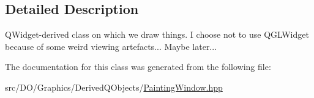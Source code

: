 \subsection{Detailed Description}
Q\-Widget-\/derived class on which we draw things. I choose not to use Q\-G\-L\-Widget because of some weird viewing artefacts... Maybe later... 

The documentation for this class was generated from the following file\-:\begin{DoxyCompactItemize}
\item 
src/\-D\-O/\-Graphics/\-Derived\-Q\-Objects/\hyperlink{_painting_window_8hpp}{Painting\-Window.\-hpp}\end{DoxyCompactItemize}
